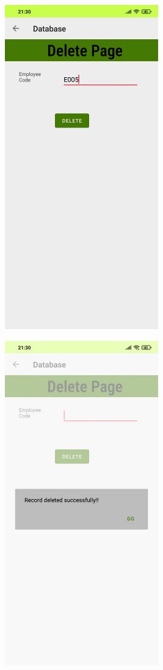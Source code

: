 \documentclass[12pt,letterpaper]{article}
\begin{document}
\subsubsection*{}
\begin{figure}[h]
    \centering
    \includegraphics[height=14cm, keepaspectratio]{Outputs/OP9.png}
\end{figure}
\begin{figure}
    \centering
    \includegraphics[height=14cm, keepaspectratio]{Outputs/OP10.png}
\end{figure}
\end{document}
